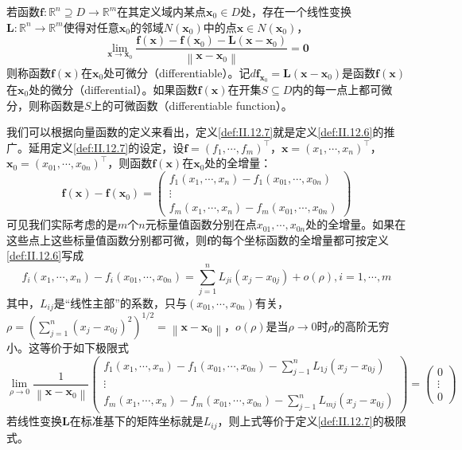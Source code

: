 \documentclass[main.tex]{subfiles}
\begin{document}
\begin{definition}\label{def:II.12.7}
若函数$\mathbf{f}:\mathbb{R}^n\supseteq D\rightarrow\mathbb{R}^m$在其定义域内某点$\mathbf{x}_0\in D$处，存在一个线性变换$\mathbf{L}:\mathbb{R}^n\rightarrow\mathbb{R}^m$使得对任意$\mathbf{x}_0$的邻域$N\left(\mathbf{x}_0\right)$中的点$\mathbf{x}\in N\left(\mathbf{x}_0\right)$，
\[\lim_{\mathbf{x}\rightarrow\mathbf{x}_0}\frac{\mathbf{f}\left(\mathbf{x}\right)-\mathbf{f}\left(\mathbf{x}_0\right)-\mathbf{L}\left(\mathbf{x}-\mathbf{x}_0\right)}{\left\|\mathbf{x}-\mathbf{x}_0\right\|}=\mathbf{0}\]
则称函数$\mathbf{f}\left(\mathbf{x}\right)$在$\mathbf{x}_0$处可微分（differentiable）。记$d\mathbf{f}_{\mathbf{x}_0}=\mathbf{L}\left(\mathbf{x}-\mathbf{x}_0\right)$是函数$\mathbf{f}\left(\mathbf{x}\right)$在$\mathbf{x}_0$处的微分（differential）。如果函数$\mathbf{f}\left(\mathbf{x}\right)$在开集$S\subseteq D$内的每一点上都可微分，则称函数是$S$上的可微函数（differentiable function）。
\end{definition}

我们可以根据向量函数的定义来看出，定义\ref{def:II.12.7}就是定义\ref{def:II.12.6}的推广。延用定义\ref{def:II.12.7}的设定，设$\mathbf{f}=\left(f_1,\cdots,f_m\right)^\intercal$，$\mathbf{x}=\left(x_1,\cdots,x_n\right)^\intercal$，$\mathbf{x}_0=\left(x_{01},\cdots,x_{0n}\right)^\intercal$，则函数$\mathbf{f}\left(\mathbf{x}\right)$在$\mathbf{x}_0$处的全增量：
\[
    \mathbf{f}\left(\mathbf{x}\right)-\mathbf{f}\left(\mathbf{x}_0\right)=\left(
    \begin{array}{c}
        f_1\left(x_1,\cdots,x_n\right)-f_1\left(x_{01},\cdots,x_{0n}\right)\\
    \vdots\\
    f_m\left(x_1,\cdots,x_n\right)-f_m\left(x_{01},\cdots,x_{0n}\right)
    \end{array}\right)
\]
可见我们实际考虑的是$m$个$n$元标量值函数分别在点$x_{01},\cdots,x_{0n}$处的全增量。如果在这些点上这些标量值函数分别都可微，则$\mathbf{f}$的每个坐标函数的全增量都可按定义\ref{def:II.12.6}写成
\[
f_i\left(x_1,\cdots,x_n\right)-f_i\left(x_{01},\cdots,x_{0n}\right)=\sum_{j=1}^n L_{ji}\left(x_j-x_{0j}\right)+o\left(\rho\right),i=1,\cdots,m
\]
其中，$L_{ij}$是“线性主部”的系数，只与$\left(x_{01},\cdots,x_{0n}\right)$有关，$\rho=\left(\sum_{j=1}^n\left(x_j-x_{0j}\right)^2\right)^{1/2}=\left\|\mathbf{x}-\mathbf{x}_0\right\|$，$o\left(\rho\right)$是当$\rho\to 0$时$\rho$的高阶无穷小。这等价于如下极限式
\[
\lim_{\rho\to 0}\frac{1}{\left\|\mathbf{x}-\mathbf{x}_0\right\|}\left(\begin{array}{c}
f_1\left(x_1,\cdots,x_n\right)-f_1\left(x_{01},\cdots,x_{0n}\right)-\sum_{j-1}^nL_{1j}\left(x_j-x_{0j}\right)\\
\vdots\\
f_m\left(x_1,\cdots,x_n\right)-f_m\left(x_{01},\cdots,x_{0n}\right)-\sum_{j-1}^nL_{mj}\left(x_j-x_{0j}\right)
\end{array}\right)=\left(\begin{array}{c}0\\\vdots\\0\end{array}\right)
\]
若线性变换$\mathbf{L}$在标准基下的矩阵坐标就是$L_{ij}$，则上式等价于定义\ref{def:II.12.7}的极限式。
\end{document}
